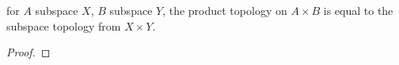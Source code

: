 \begin{lem}\label{lem:16.3}
  for $A$ subspace $X$, $B$ subspace $Y$,
  the product topology on $A\times B$ is equal to
  the subspace topology from $X\times Y$.
\end{lem}
\begin{proof}
\end{proof}

